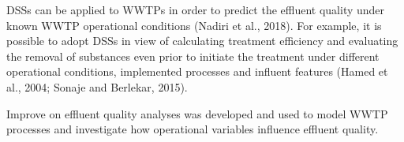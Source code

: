 



DSSs can be applied to WWTPs in order to predict the effluent quality under known WWTP operational conditions (Nadiri et al., 2018). For example, it is possible to adopt DSSs in view of calculating treatment efficiency and evaluating the removal of substances even prior to initiate the treatment under different operational conditions, implemented processes and influent features (Hamed et al., 2004; Sonaje and Berlekar, 2015).

Improve on effluent quality 
analyses was developed and used to model WWTP processes and investigate how operational variables influence effluent quality.

